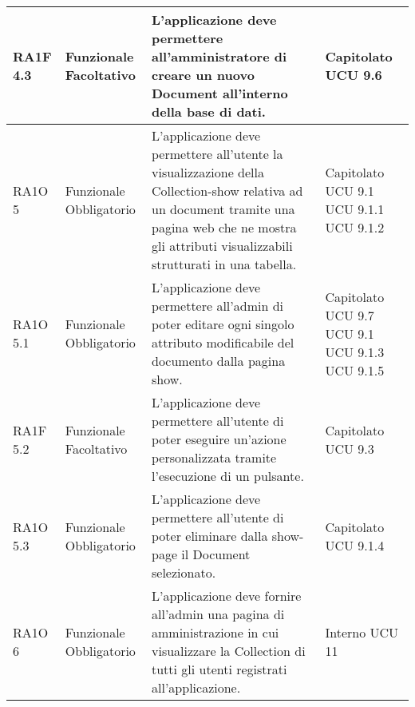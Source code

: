 \begin{center}
\begin{longtable}{ | l | p{2cm} | p{5cm} | p{1.7cm} |}
				RA1F 4.3 & Funzionale \newline  Facoltativo  & L’applicazione deve permettere all’amministratore di creare un nuovo Document all’interno della base di dati. &  Capitolato \newline  UCU 9.6 \newline  \\ \hline      
				RA1O 5 & Funzionale \newline  Obbligatorio  & L'applicazione deve permettere all'utente la visualizzazione della Collection-show relativa ad un document tramite una pagina web che ne mostra gli attributi visualizzabili strutturati in una tabella. &  Capitolato \newline  UCU 9.1 \newline  UCU 9.1.1 \newline  UCU 9.1.2 \newline  \\ \hline      
				RA1O 5.1 & Funzionale \newline  Obbligatorio  & L'applicazione deve permettere all'admin di poter editare ogni singolo attributo modificabile del documento dalla pagina show. &  Capitolato \newline  UCU 9.7 \newline  UCU 9.1 \newline  UCU 9.1.3 \newline  UCU 9.1.5 \newline  \\ \hline      
				RA1F 5.2 & Funzionale \newline  Facoltativo  & L’applicazione deve permettere all’utente di poter eseguire un’azione personalizzata tramite l’esecuzione di un pulsante. &  Capitolato \newline  UCU 9.3 \newline  \\ \hline      
				RA1O 5.3 & Funzionale \newline  Obbligatorio  & L'applicazione deve permettere all'utente di poter eliminare dalla show-page il Document selezionato.
 &  Capitolato \newline  UCU 9.1.4 \newline  \\ \hline      
				RA1O 6 & Funzionale \newline  Obbligatorio  & L'applicazione deve fornire all'admin una pagina di amministrazione in cui visualizzare la Collection di tutti gli utenti registrati all'applicazione. &  Interno \newline  UCU 11 \newline  \\ \hline      

\end{longtable}
\end{center}
